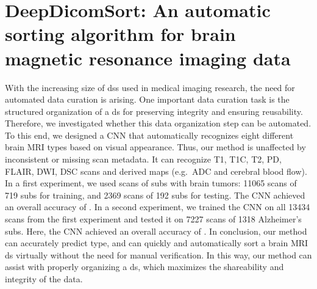 
\chapter[DeepDicomSort: An automatic sorting algorithm for brain magnetic resonance imaging data][DeepDicomSort]{DeepDicomSort: An automatic sorting algorithm for brain magnetic resonance imaging data}\label{chap:DDS}



\begin{ChapterAbstract}
With the increasing size of \glspl{ds} used in medical imaging research, the need for automated data curation is arising.
One important data curation task is the structured organization of a \gls{ds} for preserving integrity and ensuring reusability.
Therefore, we investigated whether this data organization step can be automated.
To this end, we designed a \gls{CNN} that automatically recognizes eight different brain \gls{MRI} \glspl{type} based on visual appearance.
Thus, our method is unaffected by inconsistent or missing \gls{scan} metadata.
It can recognize \gls{T1}, \gls{T1C}, \gls{T2}, \gls{PD}, \gls{FLAIR}, \gls{DWI}, \gls{DSC} \glspl{scan} and derived maps (e.g.\ \acrlong{ADC} and cerebral blood flow).
In a first experiment, we used \glspl{scan} of \glspl{sub} with brain \glspl{tumor}: \num{11065} \glspl{scan} of \num{719} \glspl{sub} for training, and \num{2369} \glspl{scan} of \num{192} \glspl{sub} for testing.
The \gls{CNN} achieved an overall accuracy of .
In a second experiment, we trained the \gls{CNN} on all \num{13434} \glspl{scan} from the first experiment and tested it on \num{7227} \glspl{scan} of \num{1318} Alzheimer's \glspl{sub}.
Here, the \gls{CNN} achieved an overall accuracy of .
In conclusion, our method can accurately predict \gls{type}, and can quickly and automatically sort a brain \gls{MRI} \gls{ds} virtually without the need for manual verification.
In this way, our method can assist with properly organizing a \gls{ds}, which maximizes the shareability and integrity of the data.

\end{ChapterAbstract}
\setcellgapes{5pt}


